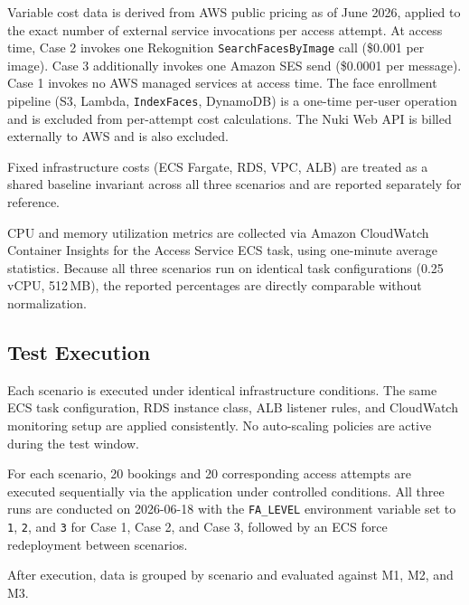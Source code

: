 Variable cost data is derived from AWS public pricing as of June 2026, applied to the exact number of external service invocations per access attempt. At access time, Case 2 invokes one Rekognition \texttt{SearchFacesByImage} call (\$0.001 per image). Case 3 additionally invokes one Amazon SES send (\$0.0001 per message). Case 1 invokes no AWS managed services at access time. The face enrollment pipeline (S3, Lambda, \texttt{IndexFaces}, DynamoDB) is a one-time per-user operation and is excluded from per-attempt cost calculations. The Nuki Web API is billed externally to AWS and is also excluded.

Fixed infrastructure costs (ECS Fargate, RDS, VPC, ALB) are treated as a shared baseline invariant across all three scenarios and are reported separately for reference.

CPU and memory utilization metrics are collected via Amazon CloudWatch Container Insights for the Access Service ECS task, using one-minute average statistics. Because all three scenarios run on identical task configurations (0.25 vCPU, 512\,MB), the reported percentages are directly comparable without normalization.

\subsection{Test Execution}

Each scenario is executed under identical infrastructure conditions. The same ECS task configuration, RDS instance class, ALB listener rules, and CloudWatch monitoring setup are applied consistently. No auto-scaling policies are active during the test window.

For each scenario, 20 bookings and 20 corresponding access attempts are executed sequentially via the application under controlled conditions. All three runs are conducted on 2026-06-18 with the \texttt{FA\_LEVEL} environment variable set to \texttt{1}, \texttt{2}, and \texttt{3} for Case 1, Case 2, and Case 3, followed by an ECS force redeployment between scenarios.

After execution, data is grouped by scenario and evaluated against M1, M2, and M3.
